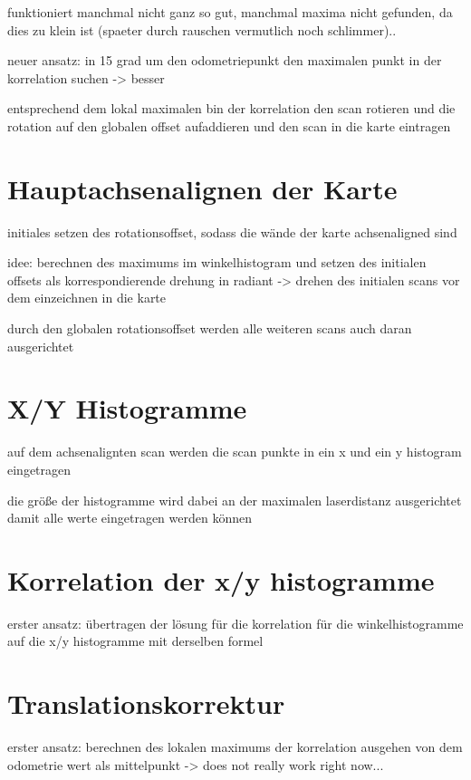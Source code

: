 \documentclass[12pt, a4paper]{article}
\begin{document}
funktioniert manchmal nicht ganz so gut, manchmal maxima nicht gefunden, da dies zu klein ist (spaeter durch rauschen vermutlich noch schlimmer)..

neuer ansatz: in 15 grad um den odometriepunkt den maximalen punkt in der korrelation suchen -> besser

entsprechend dem lokal maximalen bin der korrelation den scan rotieren und die rotation auf den globalen offset aufaddieren und den scan in die karte eintragen

\section{Hauptachsenalignen der Karte}

initiales setzen des rotationsoffset, sodass die wände der karte achsenaligned sind

idee: berechnen des maximums im winkelhistogram und setzen des initialen offsets als korrespondierende drehung in radiant -> drehen des initialen scans vor dem einzeichnen in die karte

durch den globalen rotationsoffset werden alle weiteren scans auch daran ausgerichtet

\section{X/Y Histogramme}

auf dem achsenalignten scan werden die scan punkte in ein x und ein y histogram eingetragen

die größe der histogramme wird dabei an der maximalen laserdistanz ausgerichtet damit alle werte eingetragen werden können

\section{Korrelation der x/y histogramme}

erster ansatz: übertragen der lösung für die korrelation für die winkelhistogramme auf die x/y histogramme mit derselben formel

\section{Translationskorrektur}

erster ansatz: berechnen des lokalen maximums der korrelation ausgehen von dem odometrie wert als mittelpunkt -> does not really work right now...
\end{document}
